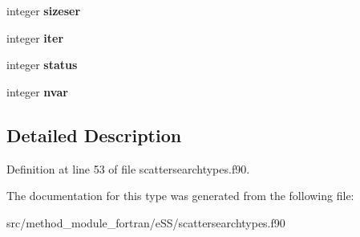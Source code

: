 \begin{DoxyCompactItemize}
\item 
\hypertarget{structscattersearchtypes_1_1algorithm__common__vars_ac0650defc6ddae85f1d6a850f8238645}{integer {\bfseries sizeser}}\label{structscattersearchtypes_1_1algorithm__common__vars_ac0650defc6ddae85f1d6a850f8238645}

\item 
\hypertarget{structscattersearchtypes_1_1algorithm__common__vars_a42c4c81461535ac3c0fe6878c0be02d6}{integer {\bfseries iter}}\label{structscattersearchtypes_1_1algorithm__common__vars_a42c4c81461535ac3c0fe6878c0be02d6}

\item 
\hypertarget{structscattersearchtypes_1_1algorithm__common__vars_afe08325752f64901c60cc3307c5b9e78}{integer {\bfseries status}}\label{structscattersearchtypes_1_1algorithm__common__vars_afe08325752f64901c60cc3307c5b9e78}

\item 
\hypertarget{structscattersearchtypes_1_1algorithm__common__vars_a9936e20d90400bda8cc24336e3609bc8}{integer {\bfseries nvar}}\label{structscattersearchtypes_1_1algorithm__common__vars_a9936e20d90400bda8cc24336e3609bc8}

\end{DoxyCompactItemize}


\subsection{Detailed Description}


Definition at line 53 of file scattersearchtypes.\-f90.



The documentation for this type was generated from the following file\-:\begin{DoxyCompactItemize}
\item 
src/method\-\_\-module\-\_\-fortran/e\-S\-S/scattersearchtypes.\-f90\end{DoxyCompactItemize}
